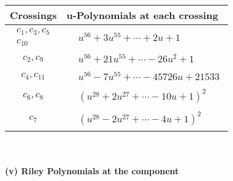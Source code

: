 \documentclass[1p]{elsarticle_modified}
\theoremstyle{definition}
\begin{document}
\begin{tabular}{m{50pt}|m{274pt}}
Crossings & \hspace{64pt}u-Polynomials at each crossing \\
\hline $$\begin{aligned}c_{1},c_{3},c_{5}\\c_{10}\end{aligned}$$&$\begin{aligned}
&u^{56}+3 u^{55}+\cdots+2 u+1
\end{aligned}$\\
\hline $$\begin{aligned}c_{2},c_{9}\end{aligned}$$&$\begin{aligned}
&u^{56}+21 u^{55}+\cdots-26 u^2+1
\end{aligned}$\\
\hline $$\begin{aligned}c_{4},c_{11}\end{aligned}$$&$\begin{aligned}
&u^{56}-7 u^{55}+\cdots-45726 u+21533
\end{aligned}$\\
\hline $$\begin{aligned}c_{6},c_{8}\end{aligned}$$&$\begin{aligned}
&(u^{28}+2 u^{27}+\cdots-10 u+1)^{2}
\end{aligned}$\\
\hline $$\begin{aligned}c_{7}\end{aligned}$$&$\begin{aligned}
&(u^{28}-2 u^{27}+\cdots-4 u+1)^{2}
\end{aligned}$\\
\hline
\end{tabular}\\~\\
\newpage\renewcommand{\arraystretch}{1}
\flushleft \textbf{(v) Riley Polynomials at the component}\newline \\
\end{document}
